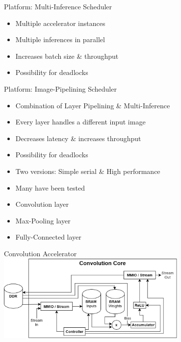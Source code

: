 \begin{frame}{Platform: Multi-Inference Scheduler}
	\begin{itemize}
		\item Multiple accelerator instances
		\item Multiple inferences in parallel
		\item Increases batch size \& throughput
		\item Possibility for deadlocks
	\end{itemize}
\end{frame}

\begin{frame}{Platform: Image-Pipelining Scheduler}
	\begin{itemize}
		\item Combination of Layer Pipelining \& Multi-Inference
		\item Every layer handles a different input image
		\item Decreases latency \& increases throughput
		\item Possibility for deadlocks
	\end{itemize}
\end{frame}

\begin{frame}
	\begin{itemize}
		\item Two versions: Simple serial \& High performance
		\item Many have been tested
		\item Convolution layer
		\item Max-Pooling layer
		\item Fully-Connected layer
	\end{itemize}
\end{frame}

\begin{frame}{Convolution Accelerator}
	\centering
	\includegraphics[width=0.7\textwidth]{../Images/Platform/Conv_core_serial.png}\\
\end{frame}

